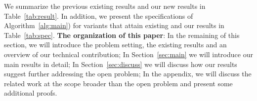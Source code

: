 We summarize the previous existing results and our new results in Table~\ref{tab:result}.
In addition, we present the specifications of Algorithm~\ref{alg:main}) for variants that attain existing and our results in Table~\ref{tab:spec}.
\textbf{The organization of this paper}: 
In the remaining of this section, we will introduce the problem setting, the existing results and an overview of our technical contribution;
In Section~\ref{sec:main} we will introduce our main results in detail;
In Section~\ref{sec:discuss} we will discuss how our results suggest further addressing the open problem;
In the appendix, we will discuss the related work at the scope broader than the open problem and present some additional proofs.

\begin{table}[!t]
\centering
\caption{Detailed specifications in Algorithm~\ref{alg:main} that achieve the exising result and our new results.}
\label{tab:spec}
\end{table}

